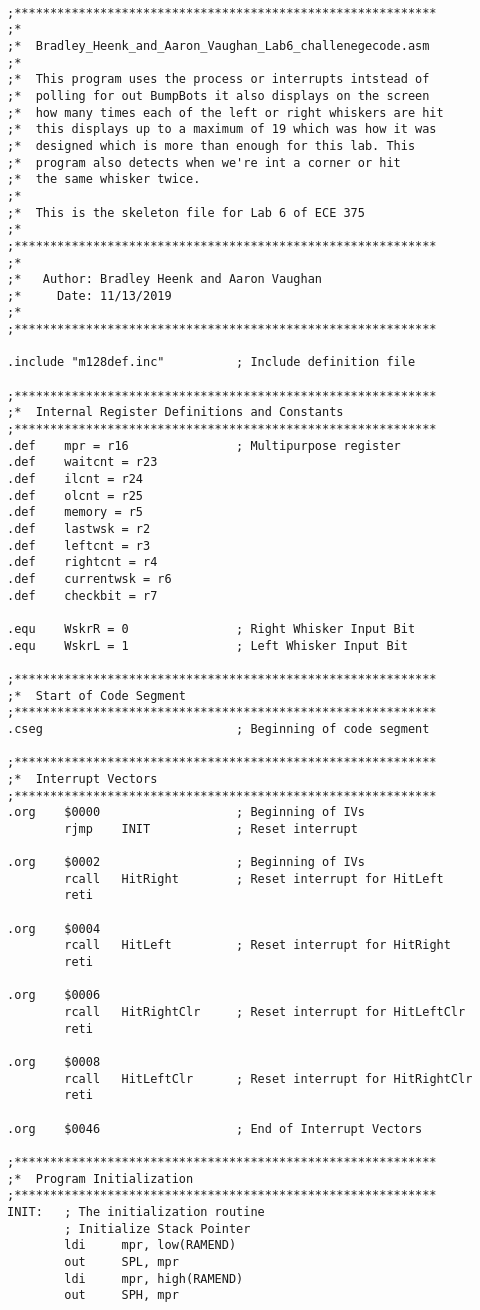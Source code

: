 \documentclass[12pt, letterpaper]{article}
\begin{document}
\begin{verbatim}

;***********************************************************
;*
;*	Bradley_Heenk_and_Aaron_Vaughan_Lab6_challenegecode.asm
;*
;*	This program uses the process or interrupts intstead of
;*	polling for out BumpBots it also displays on the screen
;*	how many times each of the left or right whiskers are hit
;*	this displays up to a maximum of 19 which was how it was
;*	designed which is more than enough for this lab. This
;*	program also detects when we're int a corner or hit
;*	the same whisker twice.
;*
;*	This is the skeleton file for Lab 6 of ECE 375
;*
;***********************************************************
;*
;*	 Author: Bradley Heenk and Aaron Vaughan
;*	   Date: 11/13/2019
;*
;***********************************************************

.include "m128def.inc"			; Include definition file

;***********************************************************
;*	Internal Register Definitions and Constants
;***********************************************************
.def	mpr = r16				; Multipurpose register 
.def	waitcnt = r23
.def	ilcnt = r24
.def	olcnt = r25
.def	memory = r5
.def	lastwsk = r2
.def	leftcnt = r3
.def	rightcnt = r4
.def	currentwsk = r6
.def	checkbit = r7

.equ	WskrR = 0				; Right Whisker Input Bit
.equ	WskrL = 1				; Left Whisker Input Bit

;***********************************************************
;*	Start of Code Segment
;***********************************************************
.cseg							; Beginning of code segment

;***********************************************************
;*	Interrupt Vectors
;***********************************************************
.org	$0000					; Beginning of IVs
		rjmp 	INIT			; Reset interrupt

.org	$0002					; Beginning of IVs
		rcall 	HitRight		; Reset interrupt for HitLeft
		reti

.org	$0004
		rcall 	HitLeft			; Reset interrupt for HitRight
		reti

.org	$0006
		rcall 	HitRightClr		; Reset interrupt for HitLeftClr
		reti

.org	$0008
		rcall 	HitLeftClr		; Reset interrupt for HitRightClr
		reti

.org	$0046					; End of Interrupt Vectors

;***********************************************************
;*	Program Initialization
;***********************************************************
INIT:	; The initialization routine
		; Initialize Stack Pointer
		ldi		mpr, low(RAMEND)
		out		SPL, mpr
		ldi		mpr, high(RAMEND)
		out		SPH, mpr


\end{verbatim}
\end{document}
